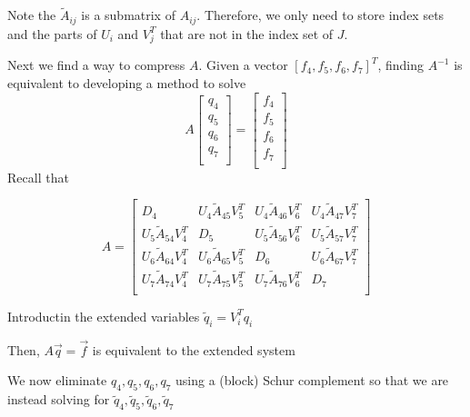 Note the $\widetilde{A}_{ij}$ is a submatrix of $A_{ij}$. Therefore, we only need to store index sets and the parts of $U_i$ and $V^T_j$ that are not in the index set of $J$.

Next we find a way to compress $A$. Given a vector $[f_4, f_5, f_6, f_7]^T$, finding $A^{-1}$ is equivalent to developing a method to solve
\begin{equation*}
    A
    \begin{bmatrix}
        q_4 \\
        q_5 \\
        q_6 \\
        q_7 \\
    \end{bmatrix}
    =
    \begin{bmatrix}
        f_4 \\
        f_5 \\
        f_6 \\
        f_7 \\
    \end{bmatrix}
\end{equation*}
Recall that

\begin{equation*}
    A =
    \begin{bmatrix}
        D_4    & U_4\widetilde{A}_{45}V^T_5 & U_4\widetilde{A}_{46}V^T_6 & U_4\widetilde{A}_{47}V^T_7 \\
        U_5\widetilde{A}_{54}V^T_4 & D_5    & U_5\widetilde{A}_{56}V^T_6 & U_5\widetilde{A}_{57}V^T_7 \\
        U_6\widetilde{A}_{64}V^T_4 & U_6\widetilde{A}_{65}V^T_5 & D_6 & U_6\widetilde{A}_{67}V^T_7 \\
        U_7\widetilde{A}_{74}V^T_4 & U_7\widetilde{A}_{75}V^T_5 & U_7\widetilde{A}_{76}V^T_6 & D_7    \\
    \end{bmatrix}
\end{equation*}

Introductin the extended variables $\widetilde{q}_i = V^T_i q_i$

Then, $A\vec{q} = \vec{f}$ is equivalent to the extended system

\begin{center}
    
\end{center}


We now eliminate $q_4, q_5, q_6, q_7$ using a (block) Schur complement so that we are instead solving for $\widetilde{q}_4, \widetilde{q}_5, \widetilde{q}_6, \widetilde{q}_7$

